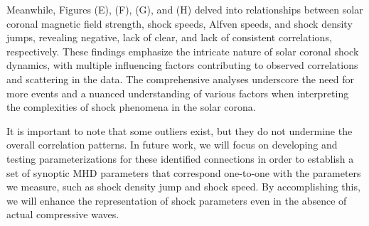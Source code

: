 Meanwhile, Figures (E), (F), (G), and (H) delved into relationships between solar coronal magnetic field strength, shock speeds, Alfven speeds, and shock density jumps, revealing negative, lack of clear, and lack of consistent correlations, respectively. These findings emphasize the intricate nature of solar coronal shock dynamics, with multiple influencing factors contributing to observed correlations and scattering in the data. The comprehensive analyses underscore the need for more events and a nuanced understanding of various factors when interpreting the complexities of shock phenomena in the solar corona.

It is important to note that some outliers exist, but they do not undermine the overall correlation patterns. In future work, we will focus on developing and testing parameterizations for these identified connections in order to establish a set of synoptic MHD parameters that correspond one-to-one with the parameters we measure, such as shock density jump and shock speed. By accomplishing this, we will enhance the representation of shock parameters even in the absence of actual compressive waves.

